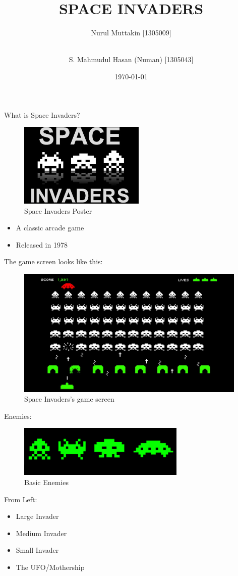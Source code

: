 \documentclass[15pt]{beamer}
\title{SPACE INVADERS}
\author[Muttakin \and Numan]{Nurul Muttakin [1305009] \and \\ S. Mahmudul Hasan (Numan) [1305043]}
\institute[BUET]{Bangladesh University of Engineering and Technology}
\date{\today}
\begin{document}
\begin{frame}
\titlepage
\end{frame}

\begin{frame}
What is Space Invaders?

	\begin{figure}[ht!]
		\centering
		\includegraphics[width=60mm]{space-invaders-2.jpg}
		\caption{Space Invaders Poster}
	\end{figure}


    \begin{itemize}
        \item A classic arcade game 
        \item Released in 1978
    \end{itemize}
\end{frame}

\begin{frame}
The game screen looks like this:
\begin{figure}[ht!]
\centering
\includegraphics[width=110mm]{space_invaders_screen.jpg}
\caption{Space Invaders's game screen}
\end{figure}
\end{frame}

\begin{frame}
Enemies:
	\begin{figure}[ht!]
	\centering
	\includegraphics[width=80mm]{basic_enemies.png}
	\caption{Basic Enemies}
	\end{figure}
From Left:
	\begin{itemize}
		\item Large Invader
		\item Medium Invader
		\item Small Invader
		\item The UFO/Mothership
	\end{itemize}
\end{frame}
\end{document}
